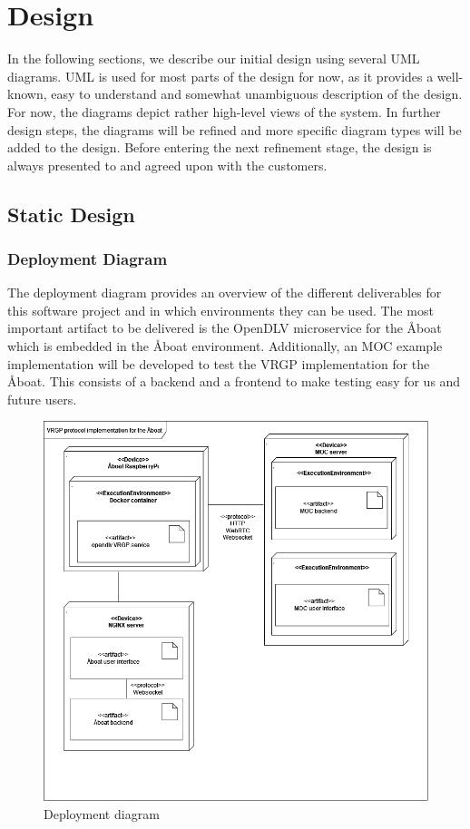 \section{Design}\label{sec:design}

In the following sections, we describe our initial design using several UML diagrams. UML is used for most parts of the design for now, as it provides a well-known, easy to understand and somewhat unambiguous description of the design. For now, the diagrams depict rather high-level views of the system. In further design steps, the diagrams will be refined and more specific diagram types will be added to the design. Before entering the next refinement stage, the design is always presented to and agreed upon with the customers.

\subsection{Static Design}

\subsubsection{Deployment Diagram}

The deployment diagram provides an overview of the different deliverables for this software project and in which environments they can be used. The most important artifact to be delivered is the OpenDLV microservice for the Åboat which is embedded in the Åboat environment. Additionally, an MOC example implementation will be developed to test the VRGP implementation for the Åboat. This consists of a backend and a frontend to make testing easy for us and future users.

\begin{figure}[ht]
	\centering
	\includegraphics[width=\linewidth]{diagrams/deployment-diagram}
	\caption{Deployment diagram}
	\label{fig:deployment-diagram}
\end{figure}

